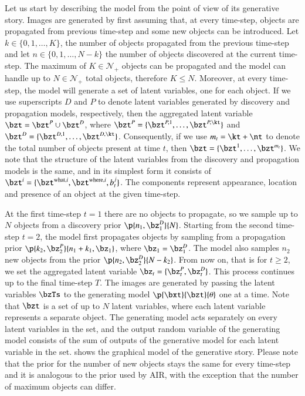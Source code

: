Let us start by describing the model from the point of view of its generative story. Images are generated by first assuming that, at every time-step, objects are propagated from previous time-step and some new objects can be introduced. Let $k \in \{0, 1, \dots, K\}$,  the number of objects propagated from the previous time-step and let $n \in \{0, 1, \dots, N - k\}$ the number of objects discovered at the current time-step. The maximum of $K \in \mathcal{N}_+$ objects can be propagated and the model can handle up to $N \in \mathcal{N}_+$ total objects, therefore $K \leq N$. Moreover, at every time-step, the model will generate a set of latent variables, one for each object. If we use superscripts $D$ and $P$ to denote latent variables generated by discovery and propagation models, respectively, then the aggregated latent variable $\bzt = \bzt^P \cup \bzt^D$, where $\bzt^P = \{ \bzt^{P, 1}, \dots, \bzt^{P, \kt} \}$ and $\bzt^D = \{ \bzt^{D, 1}, \dots, \bzt^{D, \kt} \}$. Consequently, if we use $m_t = \kt + \nt$ to denote the total number of objects present at time $t$, then $\bzt = \{ \bzt^1, \dots, \bzt^{m_t} \}$. We note that the structure of the latent variables from the discovery and propagation models is the same, and in its simplest form it consists of $\bzt^i = \{ \bzt^{\mathrm{what}, i}, \bzt^{\mathrm{where}, i}, b_t^j \}$. The components represent appearance, location and presence of an object at the given time-step.

 At the first time-step $t = 1$ there are no objects to propagate, so we sample up to $N$ objects from a discovery prior $\p{n_1, \bz_1^D}{N}$. Starting from the second time-step $t=2$, the model first propagates objects by sampling from a propagation prior $\p{k_2, \bz_2^P}{n_1 + k_1, \bz_1}$, where $\bz_1 = \bz_1^D$. The model also samples $n_2$ new objects from the prior $\p{n_2, \bz_2^D}{N - k_2}$. From now on, that is for $t \geq 2$, we set the aggregated latent variable $\bz_t = \{\bz_t^P, \bz_t^D\}$. This process continues up to the final time-step $T$. The images are generated by passing the latent variables $\bzTs$ to the generating model $\p{\bxt}{\bzt}{\theta}$ one at a time. Note that $\bzt$ is a set of up to $N$ latent variables, where each latent variable represents a separate object. The generating model acts separately on every latent variables in the set, and the output random variable of the generating model consists of the sum of outputs of the generative model for each latent variable in the set.  shows the graphical model of the generative story. Please note that the prior for the number of new objects stays the same for every time-step and it is analogous to the prior used by AIR, with the exception that the number of maximum objects can differ.

